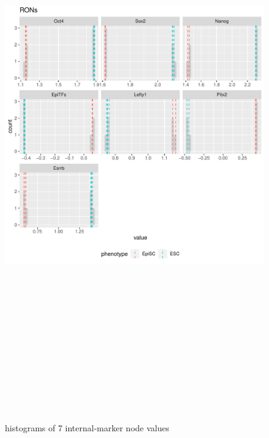 \documentclass[
]{book}
\begin{document}
\begin{figure}[H]

{\centering \includegraphics[width=460pt,height=700pt]{ipsc/results/expanded-experimental_internalmarkers} 

}

\caption{histograms of 7 internal-marker node values}\label{fig:unnamed-chunk-31}
\end{figure}
\end{document}
